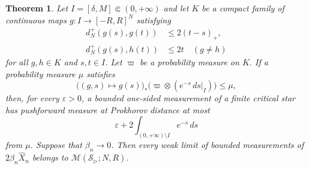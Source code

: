 \documentclass[10pt,a4paper]{amsart}
\numberwithin{equation}{section}
\newtheorem{theorem}{Theorem}[section]
\newcommand{\eps}{\varepsilon}
\begin{document}
\begin{theorem}\label{thm:finite-profile-quantization}
Let $I=[\delta,M]\Subset(0,+\infty)$ and let $K$ be a compact family of continuous maps $g\colon I\to[-R,R]^N$ satisfying
\begin{align}
d_N^+(g(s),g(t))&\le2(t-s)_+, \label{eq:star-profile-same}\\
d_N^+(g(s),h(t))&\le2t \quad(g\ne h) \label{eq:star-profile-cross}
\end{align}
for all $g,h\in K$ and $s,t\in I$.  Let $\varpi$ be a probability measure on $K$.  If a probability measure $\mu$ satisfies
\begin{equation}\label{eq:star-evaluation-submeasure} \bigl((g,s)\mapsto g(s)\bigr)_* \bigl(\varpi\otimes(e^{-s}\,ds|_I)\bigr)\le\mu, \end{equation}
then, for every $\eps>0$, a bounded one-sided measurement of a finite critical star has pushforward measure at Prokhorov distance at most
\begin{equation}\label{eq:star-quantization-error} \eps+2\int_{(0,+\infty)\setminus I}e^{-s}\,ds \end{equation}
from $\mu$.  Suppose that $\beta_n\to0$.  Then every weak limit of bounded measurements of $2\beta_n\widehat X_n$ belongs to $\mathcal M(\mathcal S_{\rhd};N,R)$.
\end{theorem}
\end{document}
